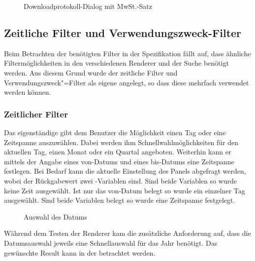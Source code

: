 \begin{figure}[htb]
	\centering
	\caption{Downloadprotokoll-Dialog mit MwSt.-Satz}
	\label{fig:alkis-protocol-new}
\end{figure}

\subsection{Zeitliche Filter und Verwendungszweck-Filter}
Beim Betrachten der benötigten Filter in der Spezifikation fällt auf, dass ähnliche Filtermöglichkeiten in den verschiedenen Renderer und der Suche benötigt werden. Aus diesem Grund wurde der zeitliche Filter und Verwendungszweck"=Filter als eigene  angelegt, so dass diese mehrfach verwendet werden können.

\subsubsection{Zeitlicher Filter}
Das eigenständige   gibt dem Benutzer die Möglichkeit einen Tag oder eine Zeitspanne auszuwählen.
Dabei werden ihm Schnellwahlmöglichkeiten für den aktuellen Tag, einen Monat oder ein Quartal angeboten.
Weiterhin kann er mittels der Angabe eines von-Datums und eines bis-Datums eine Zeitspanne festlegen.
Bei Bedarf kann die aktuelle Einstellung des Panels abgefragt werden, wobei der Rückgabewert zwei -Variablen sind.
Sind beide Variablen  so wurde keine Zeit ausgewählt.
Ist nur das von-Datum belegt so wurde ein einzelner Tag ausgewählt.
Sind beide Variablen belegt so wurde eine Zeitspanne festgelegt.

\begin{wrapfigure}{o}{0.4\textwidth}
  \centering
  \caption{Auswahl des Datums} \label{fig:jxdatepicker} 
\end{wrapfigure}
Während dem Testen der Renderer kam die zusätzliche Anforderung auf, dass die Datumsauswahl jeweils eine Schnellauswahl für das Jahr benötigt.
Das gewünschte Result kann in der  betrachtet werden.


